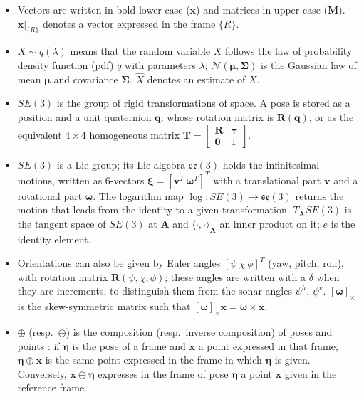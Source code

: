 \begin{itemize}                          %
  \item Vectors are written in bold lower case ($\mathbf{x}$) and matrices in upper case
        ($\mathbf{M}$). $\mathbf{x}|_{\{R\}}$ denotes a vector expressed in the frame $\{R\}$.
  \item $X \sim q(\lambda)$ means that the random variable $X$ follows the law of probability
        density function (pdf) $q$ with parameters $\lambda$; $\mathcal{N}(\boldsymbol{\mu},
        \boldsymbol{\Sigma})$ is the Gaussian law of mean $\boldsymbol{\mu}$ and covariance
        $\boldsymbol{\Sigma}$. $\hat{X}$ denotes an estimate of $X$.
  \item $SE(3)$ is the group of rigid transformations of space. A pose is stored as a position and a
        unit quaternion $\mathbf{q}$, whose rotation matrix is $\mathbf{R}(\mathbf{q})$, or as the
        equivalent $4\times4$ homogeneous matrix $\mathbf{T} = \begin{bmatrix} \mathbf{R} &
        \boldsymbol{\tau} \\ \mathbf{0} & 1 \end{bmatrix}$.
  \item $SE(3)$ is a Lie group; its Lie algebra $\mathfrak{se}(3)$ holds the infinitesimal motions,
        written as 6-vectors $\boldsymbol{\xi} = [\mathbf{v}^T\ \boldsymbol{\omega}^T]^T$ with a
        translational part $\mathbf{v}$ and a rotational part $\boldsymbol{\omega}$. The logarithm
        map $\log : SE(3) \to \mathfrak{se}(3)$ returns the motion that leads from the identity to a
        given transformation. $T_{\mathbf{A}}SE(3)$ is the tangent space of $SE(3)$ at
        $\mathbf{A}$ and $\langle \cdot, \cdot \rangle_{\mathbf{A}}$ an inner product on it; $e$ is
        the identity element.
  \item Orientations can also be given by Euler angles $[\psi\ \chi\ \phi]^T$ (yaw, pitch, roll),
        with rotation matrix $\mathbf{R}(\psi, \chi, \phi)$; these angles are written with a
        $\delta$ when they are increments, to distinguish them from the sonar angles $\psi^h$,
        $\psi^v$. $[\boldsymbol{\omega}]_\times$ is the skew-symmetric matrix such that
        $[\boldsymbol{\omega}]_\times \mathbf{x} = \boldsymbol{\omega} \times \mathbf{x}$.
  \item $\oplus$ (resp.\ $\ominus$) is the composition (resp.\ inverse composition) of poses and
        points \citep{blanco2010tutorial}: if $\boldsymbol{\eta}$ is the pose of a frame and
        $\mathbf{x}$ a point expressed in that frame, $\boldsymbol{\eta} \oplus \mathbf{x}$ is the same
        point expressed in the frame in which $\boldsymbol{\eta}$ is given. Conversely,
        $\mathbf{x} \ominus \boldsymbol{\eta}$ expresses in the frame of pose $\boldsymbol{\eta}$ a
        point $\mathbf{x}$ given in the reference frame.
\end{itemize}

